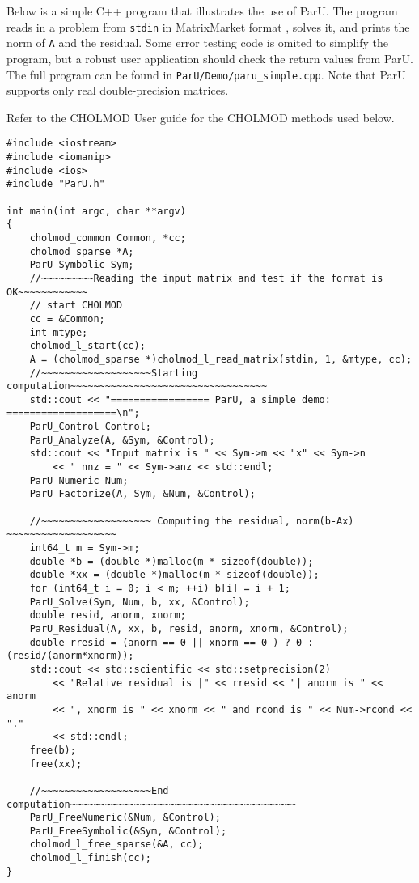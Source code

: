 \documentclass[12pt]{article}
\begin{document}
Below is a simple C++ program that illustrates the use of ParU.  The program
reads in a problem from \verb'stdin' in MatrixMarket format
\cite{BoisvertPozoRemingtonBarrettDongarra97}, solves it, and prints the norm
of \verb'A' and the residual.  Some error testing code is omited to simplify
the program, but a robust user application should check the return values from
ParU.  The full program can be found in \verb'ParU/Demo/paru_simple.cpp'.  Note
that ParU supports only real double-precision matrices.

Refer to the CHOLMOD User guide for the CHOLMOD methods used below.

\begin{verbatim}
#include <iostream>
#include <iomanip>
#include <ios>
#include "ParU.h"

int main(int argc, char **argv)
{
    cholmod_common Common, *cc;
    cholmod_sparse *A;
    ParU_Symbolic Sym;
    //~~~~~~~~~Reading the input matrix and test if the format is OK~~~~~~~~~~~~
    // start CHOLMOD
    cc = &Common;
    int mtype;
    cholmod_l_start(cc);
    A = (cholmod_sparse *)cholmod_l_read_matrix(stdin, 1, &mtype, cc);
    //~~~~~~~~~~~~~~~~~~~Starting computation~~~~~~~~~~~~~~~~~~~~~~~~~~~~~~~~~~
    std::cout << "================= ParU, a simple demo: ===================\n";
    ParU_Control Control;
    ParU_Analyze(A, &Sym, &Control);
    std::cout << "Input matrix is " << Sym->m << "x" << Sym->n
        << " nnz = " << Sym->anz << std::endl;
    ParU_Numeric Num;
    ParU_Factorize(A, Sym, &Num, &Control);

    //~~~~~~~~~~~~~~~~~~~ Computing the residual, norm(b-Ax) ~~~~~~~~~~~~~~~~~~~
    int64_t m = Sym->m;
    double *b = (double *)malloc(m * sizeof(double));
    double *xx = (double *)malloc(m * sizeof(double));
    for (int64_t i = 0; i < m; ++i) b[i] = i + 1;
    ParU_Solve(Sym, Num, b, xx, &Control);
    double resid, anorm, xnorm;
    ParU_Residual(A, xx, b, resid, anorm, xnorm, &Control);
    double rresid = (anorm == 0 || xnorm == 0 ) ? 0 : (resid/(anorm*xnorm));
    std::cout << std::scientific << std::setprecision(2)
        << "Relative residual is |" << rresid << "| anorm is " << anorm
        << ", xnorm is " << xnorm << " and rcond is " << Num->rcond << "."
        << std::endl;
    free(b);
    free(xx);

    //~~~~~~~~~~~~~~~~~~~End computation~~~~~~~~~~~~~~~~~~~~~~~~~~~~~~~~~~~~~~~
    ParU_FreeNumeric(&Num, &Control);
    ParU_FreeSymbolic(&Sym, &Control);
    cholmod_l_free_sparse(&A, cc);
    cholmod_l_finish(cc);
}
\end{verbatim}
\end{document}
